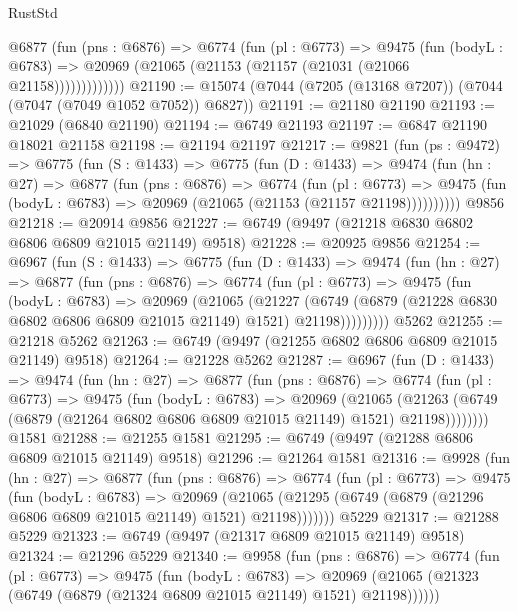\begin{lexlean}{RustStd}
\begin{coremodule}
            @6877
              (fun (pns : @6876) =>
              @6774
                (fun (pl : @6773) =>
                @9475
                  (fun (bodyL : @6783) =>
                  @20969 (@21065 (@21153 (@21157 (@21031 (@21066 @21158)))))))))))))
@21190 := @15074 (@7044 (@7205 (@13168 @7207)) (@7044 (@7047 (@7049 @1052 @7052)) @6827))
@21191 := @21180 @21190
@21193 := @21029 (@6840 @21190)
@21194 := @6749 @21193
@21197 := @6847 @21190 @18021 @21158
@21198 := @21194 @21197
@21217 := @9821
    (fun (ps : @9472) =>
    @6775
      (fun (S : @1433) =>
      @6775
        (fun (D : @1433) =>
        @9474
          (fun (hn : @27) =>
          @6877
            (fun (pns : @6876) =>
            @6774
              (fun (pl : @6773) =>
              @9475 (fun (bodyL : @6783) => @20969 (@21065 (@21153 (@21157 @21198))))))))))
    @9856
@21218 := @20914 @9856
@21227 := @6749 (@9497 (@21218 @6830 @6802 @6806 @6809 @21015 @21149) @9518)
@21228 := @20925 @9856
@21254 := @6967
    (fun (S : @1433) =>
    @6775
      (fun (D : @1433) =>
      @9474
        (fun (hn : @27) =>
        @6877
          (fun (pns : @6876) =>
          @6774
            (fun (pl : @6773) =>
            @9475
              (fun (bodyL : @6783) =>
              @20969
                (@21065
                  (@21227
                    (@6749
                      (@6879 (@21228 @6830 @6802 @6806 @6809 @21015 @21149) @1521)
                      @21198)))))))))
    @5262
@21255 := @21218 @5262
@21263 := @6749 (@9497 (@21255 @6802 @6806 @6809 @21015 @21149) @9518)
@21264 := @21228 @5262
@21287 := @6967
    (fun (D : @1433) =>
    @9474
      (fun (hn : @27) =>
      @6877
        (fun (pns : @6876) =>
        @6774
          (fun (pl : @6773) =>
          @9475
            (fun (bodyL : @6783) =>
            @20969
              (@21065
                (@21263 (@6749 (@6879 (@21264 @6802 @6806 @6809 @21015 @21149) @1521) @21198))))))))
    @1581
@21288 := @21255 @1581
@21295 := @6749 (@9497 (@21288 @6806 @6809 @21015 @21149) @9518)
@21296 := @21264 @1581
@21316 := @9928
    (fun (hn : @27) =>
    @6877
      (fun (pns : @6876) =>
      @6774
        (fun (pl : @6773) =>
        @9475
          (fun (bodyL : @6783) =>
          @20969
            (@21065 (@21295 (@6749 (@6879 (@21296 @6806 @6809 @21015 @21149) @1521) @21198)))))))
    @5229
@21317 := @21288 @5229
@21323 := @6749 (@9497 (@21317 @6809 @21015 @21149) @9518)
@21324 := @21296 @5229
@21340 := @9958
    (fun (pns : @6876) =>
    @6774
      (fun (pl : @6773) =>
      @9475
        (fun (bodyL : @6783) =>
        @20969 (@21065 (@21323 (@6749 (@6879 (@21324 @6809 @21015 @21149) @1521) @21198))))))

\end{coremodule}
\end{lexlean}
